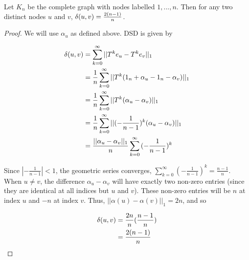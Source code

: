\begin{theorem}
  Let $K_n$ be the complete graph with nodes labelled $1,...,n$. Then for any
  two distinct nodes $u$ and $v$, $\delta(u,v) = \frac{2(n-1)}{n}$.
\end{theorem}
\begin{proof}
  We will use $\alpha_u$ as defined above. DSD is given by

\begin{align*}
  \delta(u,v) &= \sum_{k = 0}^{\infty}{||T^ke_u - T^ke_v||_1} \\
              &= \frac{1}{n}\sum_{k = 0}^{\infty}{||T^k(1_n + \alpha_u - 1_n -
                \alpha_v)||_1}\\
              &= \frac{1}{n}\sum_{k = 0}^{\infty}{||T^k(\alpha_u - \alpha_v)||_1} \\
              &= \frac{1}{n}\sum_{k = 0}^{\infty}{||(-\frac{1}{n-1})^k(\alpha_u -
                \alpha_v)||_1} \\
              &= \frac{||\alpha_u - \alpha_v||_1}{n}
                \sum_{k = 0}^{\infty}{(-\frac{1}{n-1})^k} \\
\end{align*}

Since $|-\frac{1}{n-1}| < 1$, the geometric series converges,
$\sum_{k=0}^{\infty}(-\frac{1}{n-1})^k = \frac{n-1}{n}$. When $u \neq v$, the
difference $\alpha_u - \alpha_v$ will have exactly two non-zero entries (since
they are identical at all indices but $u$ and $v$). These non-zero entries will
be $n$ at index $u$ and $-n$ at index $v$. Thus,
$||\alpha(u)-\alpha(v)||_1 = 2n$, and so

\begin{align*}
  \delta(u,v) &= \frac{2n}{n}(\frac{n-1}{n}) \\
              &= \frac{2(n-1)}{n} \\
\end{align*}

\end{proof}


